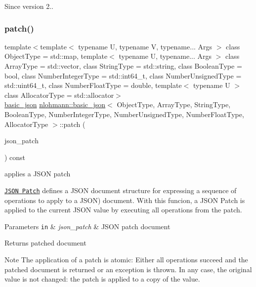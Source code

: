 \begin{DoxySince}{Since}
version 2.. 
\end{DoxySince}
\hypertarget{classnlohmann_1_1basic__json_aff9d131320db407da31304fb2b5cb7a5}{}\label{classnlohmann_1_1basic__json_aff9d131320db407da31304fb2b5cb7a5} 
\subsubsection{\texorpdfstring{patch()}{patch()}}
{\footnotesize\ttfamily template$<$template$<$ typename U, typename V, typename... Args $>$ class Object\+Type = std\+::map, template$<$ typename U, typename... Args $>$ class Array\+Type = std\+::vector, class String\+Type  = std\+::string, class Boolean\+Type  = bool, class Number\+Integer\+Type  = std\+::int64\+\_\+t, class Number\+Unsigned\+Type  = std\+::uint64\+\_\+t, class Number\+Float\+Type  = double, template$<$ typename U $>$ class Allocator\+Type = std\+::allocator$>$ \\
\hyperlink{classnlohmann_1_1basic__json}{basic\+\_\+json} \hyperlink{classnlohmann_1_1basic__json}{nlohmann\+::basic\+\_\+json}$<$ Object\+Type, Array\+Type, String\+Type, Boolean\+Type, Number\+Integer\+Type, Number\+Unsigned\+Type, Number\+Float\+Type, Allocator\+Type $>$\+::patch (\begin{DoxyParamCaption}\item[{const \hyperlink{classnlohmann_1_1basic__json}{basic\+\_\+json}$<$ Object\+Type, Array\+Type, String\+Type, Boolean\+Type, Number\+Integer\+Type, Number\+Unsigned\+Type, Number\+Float\+Type, Allocator\+Type $>$ \&}]{json\+\_\+patch }\end{DoxyParamCaption}) const\hspace{0.3cm}{\ttfamily [inline]}}



applies a J\+S\+ON patch 

\href{http://jsonpatch.com}{\tt J\+S\+ON Patch} defines a J\+S\+ON document structure for expressing a sequence of operations to apply to a J\+S\+ON) document. With this funcion, a J\+S\+ON Patch is applied to the current J\+S\+ON value by executing all operations from the patch.


\begin{DoxyParams}[1]{Parameters}
\mbox{\tt in}  & {\em json\+\_\+patch} & J\+S\+ON patch document \\
\hline
\end{DoxyParams}
\begin{DoxyReturn}{Returns}
patched document
\end{DoxyReturn}
\begin{DoxyNote}{Note}
The application of a patch is atomic\+: Either all operations succeed and the patched document is returned or an exception is thrown. In any case, the original value is not changed\+: the patch is applied to a copy of the value.
\end{DoxyNote}

